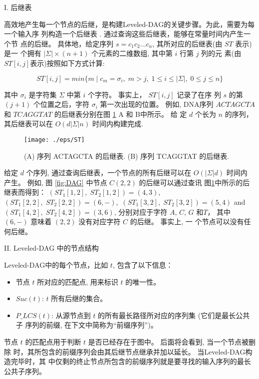 \documentclass[utf8]{frontiersSCNS} %
\begin{document}
I. 后继表
\label{sec:successor table}

高效地产生每一个节点的后继，是构建Leveled-DAG的关键步骤。为此，需要为每一个输入序
列构造一个后继表 \cite{Chen2006}. 通过查询这些后继表，能够在常量时间内产生一个节
点的后继。 具体地，给定序列 $s=c_1c_2...c_n$, 其所对应的后继表(由 $ST$ 表示)是一
个拥有 $|\Sigma| \times (n+1)$ 个元素的二维数组, 其中第 $i$ 行第 $j$ 列的元
素(由$ST[i, j]$表示)按照如下方式计算:

$$ST[i,j]=min\{m\;|\;c_m=\sigma_i,\; m > j,\; 1 \leq i \leq
|\Sigma|,\; 0 \leq j \leq n\}$$

其中 $\sigma_i$ 是字符集 $\Sigma$ 中第 $i$ 个字符。 事实上， $ST[i,j]$ 记录了在序
列 $s$ 的第 $(j+1)$ 个位置之后，字符 $\sigma_i$ 第一次出现的位置。 例如,
DNA序列 $ACTAGCTA$ 和 $TCAGGTAT$ 的后继表分别在图 \ref{fig:ST} A 和 B中所示。 给
定 $d$ 个长为 $n$ 的序列， 其后继表可以在 $O(d|\Sigma|n)$ 时间内构建完成.

\begin{figure}
  \centering
  \texttt{[image: ./eps/ST]}
  \caption{(A) 序列 ACTAGCTA 的后继表. (B) 序列 TCAGGTAT 的后继表.}
    \label{fig:ST}
  \end{figure}

  给定 $d$ 个序列, 通过查询后继表，一个节点的所有后继可以在 $O(|\Sigma|d)$ 时间内
  产生。 例如, 图 \ref{fig:DAG} 中节点 $C(2, 2)$ 的后继可以通过查讯
  图\ref{fig:ST}中所示的后继表而得到： $(ST_1[1, 2],\;ST_2[1, 2]) = (4, 3)$,\,
  $(ST_1[2, 2],\;ST_2[2, 2]) = (6, -)$,\, $(ST_1[3, 2],\;ST_2[3, 2]) = (5, 4)$
  and $(ST_1[4, 2],\;ST_2[4, 2]) = (3, 6)$, 分别对应于字符 $A$, $C$,
  $G$ 和$T$， 其中 $(6, -)$ 意味着 $(2, 2)$ 没有对应字符 $C$ 的后继。 事实上, 一
  个节点可以没有任何后继。

II. Leveled-DAG 中的节点结构
\label{sec:Node}

Leveled-DAG中的每个节点，比如 $t$, 包含了以下信息：

\begin{itemize}
\item 节点 $t$ 所对应的匹配点, 用来标识 $t$ 的唯一性。
\item $Suc(t)$: $t$ 所有后继的集合。
\item $P\_LCS(t)$: 从源节点到 $t$ 的所有最长路径所对应的序列集 (它们是最长公共子
  序列的前缀, 在下文中简称为“前缀序列”)。
\end{itemize}

节点 $t$ 的匹配点用于判断 $t$ 是否已经存在于图中。 后面将会看到, 当一个节点被删除
时，其所包含的前缀序列会由其后继节点继承并加以延长。 当Leveled-DAG构造完毕时，其
中仅剩的终止节点所包含的前缀序列就是要寻找的输入序列的最长公共子序列。
\end{document}
